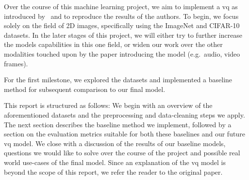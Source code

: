 Over the course of this machine learning project, we aim to implement a \ac{vq} as introduced by~\cite{vqvae}
and to reproduce the results of the authors.
To begin, we focus solely on the field of 2D images, specifically using the ImageNet and CIFAR-10 datasets.
In the later stages of this project, we will either try to further increase the models capabilities in this one field,
or widen our work over the other modalities touched upon by the paper introducing the model (e.g.\ audio, video frames).

For the first milestone, we explored the datasets and implemented a baseline method for subsequent comparison to our
final model.

This report is structured as follows: We begin with an overview of the aforementioned datasets and the preprocessing and
data-cleaning steps we apply.
The next section describes the baseline method we implement, followed by a section on the evaluation metrics suitable
for both these baselines and our future \ac{vq} model.
We close with a discussion of the results of our baseline models, questions we would like to solve over the course of
the project and possible real world use-cases of the final model.
Since an explanation of the \ac{vq} model is beyond the scope of this report, we refer the reader to the original paper.
